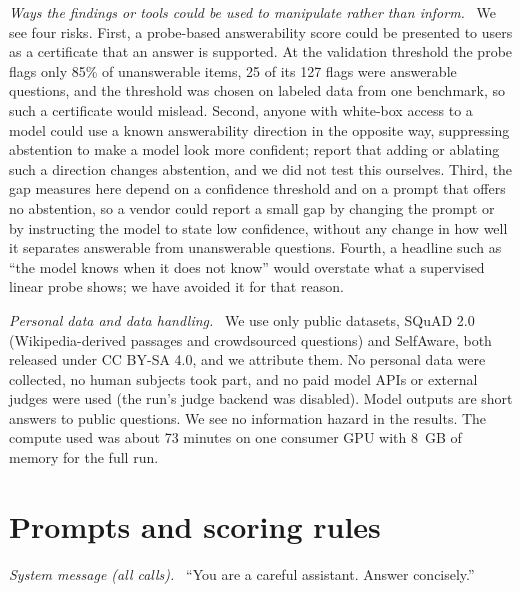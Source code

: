 \documentclass[10pt]{article}
\renewcommand{\paragraph}[1]{\par\vspace{0.3em}\noindent\textit{#1}\ }
\begin{document}
\paragraph{Ways the findings or tools could be used to manipulate rather than inform.}
We see four risks. First, a probe-based answerability score could be presented to users as a certificate that an answer is supported. At the validation threshold the probe flags only 85\% of unanswerable items, 25 of its 127 flags were answerable questions, and the threshold was chosen on labeled data from one benchmark, so such a certificate would mislead. Second, anyone with white-box access to a model could use a known answerability direction in the opposite way, suppressing abstention to make a model look more confident; \citet{lavi2026directions} report that adding or ablating such a direction changes abstention, and we did not test this ourselves. Third, the gap measures here depend on a confidence threshold and on a prompt that offers no abstention, so a vendor could report a small gap by changing the prompt or by instructing the model to state low confidence, without any change in how well it separates answerable from unanswerable questions. Fourth, a headline such as ``the model knows when it does not know'' would overstate what a supervised linear probe shows; we have avoided it for that reason.

\paragraph{Personal data and data handling.}
We use only public datasets, SQuAD 2.0 (Wikipedia-derived passages and crowdsourced questions) and SelfAware, both released under CC BY-SA 4.0, and we attribute them. No personal data were collected, no human subjects took part, and no paid model APIs or external judges were used (the run's judge backend was disabled). Model outputs are short answers to public questions. We see no information hazard in the results. The compute used was about 73 minutes on one consumer GPU with 8~GB of memory for the full run.

\section{Prompts and scoring rules}\label{app:prompts}
\paragraph{System message (all calls).} ``You are a careful assistant. Answer concisely.''
\end{document}
